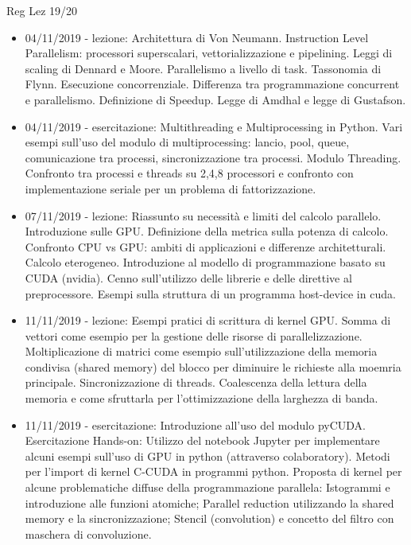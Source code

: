 \begin{frame}[allowframebreaks]{Reg Lez 19/20}
\begin{itemize}[resume]
\item 04/11/2019 - lezione: Architettura di Von Neumann. Instruction Level Parallelism: processori superscalari, vettorializzazione e pipelining. Leggi di scaling di Dennard e Moore. Parallelismo a livello di task. Tassonomia di Flynn. Esecuzione concorrenziale. Differenza tra programmazione concurrent e parallelismo. Definizione di Speedup. Legge di Amdhal e legge di Gustafson.
\item 04/11/2019 - esercitazione: Multithreading e Multiprocessing in Python. Vari esempi sull'uso del modulo di multiprocessing: lancio, pool, queue, comunicazione tra processi, sincronizzazione tra processi. Modulo Threading. Confronto tra processi e threads su 2,4,8 processori e confronto con implementazione seriale per un problema di fattorizzazione.
\item 07/11/2019 - lezione: Riassunto su necessità e limiti del calcolo parallelo. Introduzione sulle GPU. Definizione della metrica sulla potenza di calcolo. Confronto CPU vs GPU: ambiti di applicazioni e differenze architetturali. Calcolo eterogeneo. Introduzione al modello di programmazione basato su CUDA (nvidia). Cenno sull'utilizzo delle librerie e delle direttive al preprocessore. Esempi sulla struttura di un programma host-device in cuda.
\item 11/11/2019 - lezione: Esempi pratici di scrittura di kernel GPU. Somma di vettori come esempio per la gestione delle risorse di parallelizzazione. Moltiplicazione di matrici come esempio sull'utilizzazione della memoria condivisa (shared memory) del blocco per diminuire le richieste alla moemria principale. Sincronizzazione di threads. Coalescenza della lettura della memoria e come sfruttarla per l'ottimizzazione della larghezza di banda.
\item 11/11/2019 - esercitazione: Introduzione all'uso del modulo pyCUDA. Esercitazione Hands-on: Utilizzo del notebook Jupyter per implementare alcuni esempi sull'uso di GPU in python (attraverso colaboratory). Metodi per l'import di kernel C-CUDA in programmi python. Proposta di kernel per alcune problematiche diffuse della programmazione parallela: Istogrammi e introduzione alle funzioni atomiche; Parallel reduction utilizzando la shared memory e la sincronizzazione; Stencil (convolution) e concetto del filtro con maschera di convoluzione.
\end{itemize}



\end{frame}
